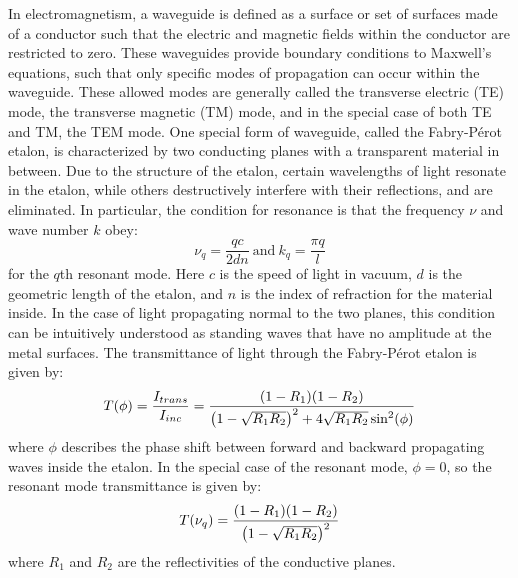 \documentclass{report}
\begin{document}
        In electromagnetism, a waveguide is defined as a surface or set of surfaces made of a conductor such that the electric and magnetic fields within the conductor are restricted to zero. These waveguides provide boundary conditions to Maxwell's equations, such that only specific modes of propagation can occur within the waveguide. These allowed modes are generally called the transverse electric (TE) mode, the transverse magnetic (TM) mode, and in the special case of both TE and TM, the TEM mode\cite{griffiths1999}. One special form of waveguide, called the Fabry-P\'erot etalon, is characterized by two conducting planes with a transparent material in between. Due to the structure of the etalon, certain wavelengths of light resonate in the etalon, while others destructively interfere with their reflections, and are eliminated\cite{Ismail2016}. In particular, the condition for resonance is that the frequency $\nu$ and wave number $k$ obey:
        \begin{equation}
            \nu_q=\frac{qc}{2dn}\ \mathrm{and}\ k_q=\frac{\pi q}{l}
        \end{equation}
        for the $q$th resonant mode. Here $c$ is the speed of light in vacuum, $d$ is the geometric length of the etalon, and $n$ is the index of refraction for the material inside\cite{Pollnau2018}. In the case of light propagating normal to the two planes, this condition can be intuitively understood as standing waves that have no amplitude at the metal surfaces. The transmittance of light through the Fabry-P\'erot etalon is given by:
        \begin{equation}
            T(\phi)=\frac{I_{trans}}{I_{inc}}=\frac{\qty(1-R_1)\qty(1-R_2)}{\qty(1-\sqrt{R_1R_2})^2+4\sqrt{R_1R_2}\sin^2(\phi)}
        \end{equation}
        where $\phi$ describes the phase shift between forward and backward propagating waves inside the etalon. In the special case of the resonant mode, $\phi=0$, so the resonant mode transmittance is given by:
        \begin{equation}
            T\qty(\nu_q)=\frac{\qty(1-R_1)\qty(1-R_2)}{\qty(1-\sqrt{R_1R_2})^2}
        \end{equation}
        where $R_1$ and $R_2$ are the reflectivities of the conductive planes\cite{siegman1986}.
        
\end{document}
